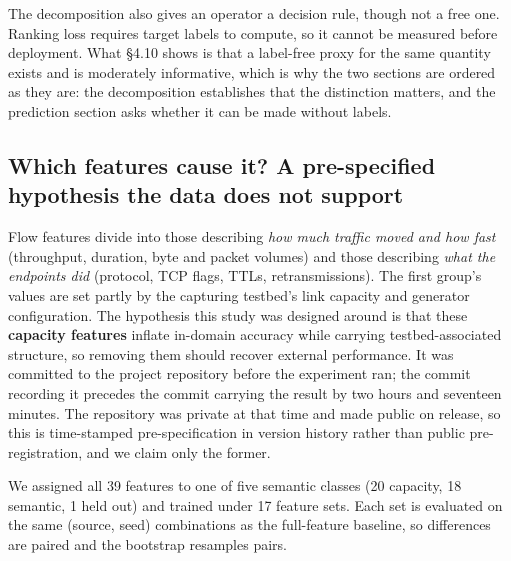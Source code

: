 \documentclass[preprint,12pt,nopreprintline]{elsarticle}
\begin{document}
The decomposition also gives an operator a decision rule, though not a free one. Ranking loss requires target labels to compute, so it cannot be measured before deployment. What \S{}4.10 shows is that a label-free proxy for the same quantity exists and is moderately informative, which is why the two sections are ordered as they are: the decomposition establishes that the distinction matters, and the prediction section asks whether it can be made without labels.

\subsection{Which features cause it? A pre-specified hypothesis the data does not support}

Flow features divide into those describing \emph{how much traffic moved and how fast} (throughput, duration, byte and packet volumes) and those describing \emph{what the endpoints did} (protocol, TCP flags, TTLs, retransmissions). The first group's values are set partly by the capturing testbed's link capacity and generator configuration. The hypothesis this study was designed around is that these \textbf{capacity features} inflate in-domain accuracy while carrying testbed-associated structure, so removing them should recover external performance. It was committed to the project repository before the experiment ran; the commit recording it precedes the commit carrying the result by two hours and seventeen minutes. The repository was private at that time and made public on release, so this is time-stamped pre-specification in version history rather than public pre-registration, and we claim only the former.

We assigned all 39 features to one of five semantic classes (20 capacity, 18 semantic, 1 held out) and trained under 17 feature sets. Each set is evaluated on the same (source, seed) combinations as the full-feature baseline, so differences are paired and the bootstrap resamples pairs.
\end{document}

